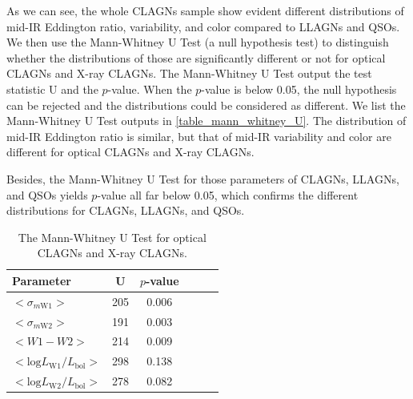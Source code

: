 \documentclass[linenumbers]{aastex631}
\begin{document}
{\color{red}As we can see, the whole CLAGNs sample show evident different distributions of mid-IR Eddington ratio, variability, and color compared to LLAGNs and QSOs. We then use the Mann-Whitney U Test (a null hypothesis test) to distinguish whether the distributions of those are significantly different or not for optical CLAGNs and X-ray CLAGNs. The Mann-Whitney U Test output the test statistic U and the $p$-value. When the $p$-value is below 0.05, the null hypothesis can be rejected and the distributions could be considered as different. We list the Mann-Whitney U Test outputs in \autoref{table_mann_whitney_U}. The distribution of mid-IR Eddington ratio is similar, but that of mid-IR variability and color are different for optical CLAGNs and X-ray CLAGNs.

Besides, the Mann-Whitney U Test for those parameters of CLAGNs, LLAGNs, and QSOs yields $p$-value all far below 0.05, which confirms the different distributions for CLAGNs, LLAGNs, and QSOs. } 

\begin{table}
 \caption{The Mann-Whitney U Test for optical CLAGNs and X-ray CLAGNs.
}
 \label{table_mann_whitney_U}
 \begin{center}
 \begin{tabular}{lccccc}
 \hline\hline
Parameter            & U &   $p$-value  \\ 
 \hline
$<\sigma_{m \mathrm{W1}}>$    &  205    &  0.006       \\ 
$<\sigma_{m \mathrm{W2}}>$    &  191   & 0.003      \\ 
$<W1-W2>$          &   214     &  0.009    \\ 
$<\mathrm{log} L_\mathrm{W1}/L_\mathrm{bol}>$ & 298  & 0.138  \\ 
$<\mathrm{log} L_\mathrm{W2}/L_\mathrm{bol}>$ & 278  & 0.082     \\  
\hline\hline
\end{tabular}
\end{center}
\end{table}
\end{document}
